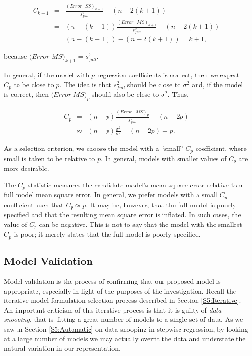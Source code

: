 \begin{center}
\begin{eqnarray*}
C_{k+1} &=&\frac{(Error\text{ }SS)_{k+1}}{s_{full}^2}-(n-2(k+1)) \\
&=&(n-(k+1))\frac{(Error\text{ }MS)_{k+1}}{s_{full}^2}-(n-2(k+1)) \\
&=&(n-(k+1))-(n-2(k+1))=k+1,
\end{eqnarray*}
\end{center}

\noindent because $(Error$ $MS)_{k+1}=s_{full}^2$.

In general, if the model with $p$ regression coefficients is
correct, then we expect $C_{p}$ to be close to $p$. The idea is that
$s_{full}^2$ should
be close to $\sigma ^2$ and, if the model is correct, then $(Error$ $%
MS)_{p}$ should also be close to $\sigma ^2$. Thus,

\begin{center}
\begin{eqnarray*}
C_{p} &=&(n-p)\frac{(Error\text{ }MS)_{p}}{s_{full}^2}-(n-2p) \\
&\approx &(n-p)\frac{\sigma ^2}{\sigma ^2}-(n-2p)=p.
\end{eqnarray*}
\end{center}

As a selection criterion, we choose the model with a ``small''
$C_{p}$ coefficient, where small is taken to be relative to $p$. In
general, models with smaller values of $C_{p}$ are more desirable.

The $C_{p}$ statistic measures the candidate model's mean square error
relative to a full model mean square error. In general, we prefer models
with a small $C_{p}$ coefficient such that $C_{p}\approx p$. It may be,
however, that the full model is poorly specified and that the resulting mean
square error is inflated. In such cases, the value of $C_{p}$ can be
negative. This is not to say that the model with the smallest $C_{p}$ is
poor; it merely states that the full model is poorly specified.

\subsection{Model Validation}\label{S5:ModelValidation}

Model validation is the process of confirming that our proposed
model is appropriate, especially in light of the purposes of the
investigation. Recall the iterative model formulation selection
process described in Section \ref{S5:Iterative}. An important
criticism of this iterative process is that it is guilty of
\emph{data-snooping}, that is, fitting a great number of models to a
single set of data. As we saw in Section \ref{S5:Automatic} on
data-snooping in stepwise regression, by looking at a large number
of models we may actually overfit the data and understate the
natural variation in our representation.


